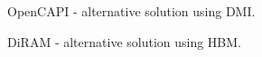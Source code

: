 \noindent
OpenCAPI - alternative solution using DMI.

\noindent
DiRAM - alternative solution using HBM.

